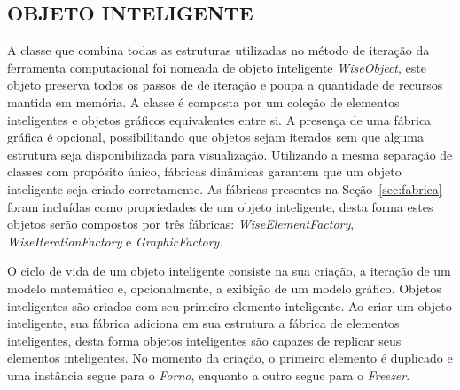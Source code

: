 \subsection{OBJETO INTELIGENTE}\label{sec:objeto_inteligente}

A classe que combina todas as estruturas utilizadas no método de iteração da ferramenta computacional foi nomeada de objeto inteligente \textit{WiseObject}, este objeto preserva todos os passos de de iteração e poupa a quantidade de recursos mantida em memória. A classe é composta por um coleção de elementos inteligentes e objetos gráficos equivalentes entre si. A presença de uma fábrica gráfica é opcional, possibilitando que objetos sejam iterados sem que alguma estrutura seja disponibilizada para visualização. Utilizando a mesma separação de classes com propósito único, fábricas dinâmicas garantem que um objeto inteligente seja criado corretamente. As fábricas presentes na Seção~\ref{sec:fabrica} foram incluídas como propriedades de um objeto inteligente, desta forma estes objetos serão compostos por três fábricas: \textit{WiseElementFactory}, \textit{WiseIterationFactory} e \textit{GraphicFactory}.


O ciclo de vida de um objeto inteligente consiste na sua criação, a iteração de um modelo matemático e, opcionalmente, a exibição de um modelo gráfico. Objetos inteligentes são criados com seu primeiro elemento inteligente. Ao criar um objeto inteligente, sua fábrica adiciona em sua estrutura a fábrica de elementos inteligentes, desta forma objetos inteligentes são capazes de replicar seus elementos inteligentes. No momento da criação, o primeiro elemento é duplicado e uma instância segue para o \textit{Forno}, enquanto a outro segue para o \textit{Freezer}.


